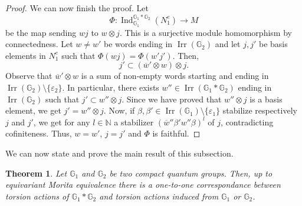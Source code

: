 \documentclass[a4paper, 11pt]{amsart}
\theoremstyle{plain}
\newtheorem{thm}{Theorem}[section]
\theoremstyle{definition}
\theoremstyle{remark}
\DeclareMathOperator{\Ind}{Ind}
\DeclareMathOperator{\Irr}{Irr}
\newcommand{\G}{\mathbb{G}}
\newcommand{\N}{\mathbb{N}}
\begin{document}
\begin{proof}
We can now finish the proof. Let
\begin{equation*}
\Phi : \Ind_{\G_{1}}^{\G_{1}\ast\G_{2}}(N_{1}^{e}) \rightarrow M
\end{equation*}
be the map sending $wj$ to $w\otimes j$. This is a surjective module homomorphism by connectedness. Let $w\neq w'$ be words ending in $\Irr(\G_{2})$ and let $j, j'$ be basis elements in $N_{1}^{e}$ such that $\Phi(wj) = \Phi(w'j')$. Then,
\begin{equation*}
j'\subset(\overline{w}'\otimes w)\otimes j.
\end{equation*}
Observe that $\overline{w}'\otimes w$ is a sum of non-empty words starting and ending in $\Irr(\G_{2})\setminus\{\varepsilon_{2}\}$. In particular, there exists $w''\in \Irr(\G_{1}\ast\G_{2})$ ending in $\Irr(\G_{2})$ such that $j'\subset w''\otimes j$. Since we have proved that $w''\otimes j$ is a basis element, we get $j' = w''\otimes j$. Now, if $\beta, \beta'\in \Irr(\G_{1})\setminus\{\varepsilon_{1}\}$ stabilize respectively $j$ and $j'$, we get for any $l\in \N$ a stabilizer $(\overline{w}''\beta'w''\beta)^{l}$ of $j$, contradicting cofiniteness. Thus, $w=w'$, $j=j'$ and $\Phi$ is faithful.
\end{proof}

We can now state and prove the main result of this subsection.

\begin{thm}\label{thm:actionsfreeproduct}
Let $\G_{1}$ and $\G_{2}$ be two compact quantum groups. Then, up to equivariant Morita equivalence there is a one-to-one correspondance between torsion actions of $\G_{1}\ast\G_{2}$ and torsion actions induced from $\G_{1}$ or $\G_{2}$.
\end{thm}
\end{document}
